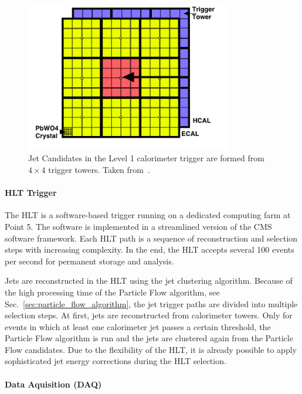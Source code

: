 \begin{figure}[htp]
    \centering
    \includegraphics[width=0.8\textwidth]{figures/experimental_setup/l1_calo_towers.png}\hfill
    \caption[Jet Candidates in the Level 1 calorimeter trigger]{Jet Candidates
        in the Level 1 calorimeter trigger are formed from $4\times4$ trigger
        towers. Taken from~\cite{Rose:2009zz}.}
    \label{fig:cms:l1_calo_towers}
\end{figure}

\paragraph{HLT Trigger} 
The HLT is a software-based trigger running on a dedicated computing farm at
Point 5. The software is implemented in a streamlined version of the CMS
software framework. Each HLT path is a sequence of reconstruction and
selection steps with increasing complexity. In the end, the HLT accepts several
100 events per second for permanent storage and analysis.

Jets are reconstructed in the HLT using the \antikt jet clustering algorithm. Because of the
high processing time of the Particle Flow algorithm, see
Sec.~\ref{sec:particle_flow_algorithm}, the jet trigger paths are divided into
multiple selection steps. At first, jets are reconstructed from calorimeter
towers.  Only for events in which at least one calorimeter jet passes a certain
\pt threshold, the Particle Flow algorithm is run and the jets are clustered
again from the Particle Flow candidates. Due to the flexibility of the HLT, it
is already possible to apply sophisticated jet energy corrections during the HLT
 selection.

\paragraph{Data Aquisition (DAQ)}

